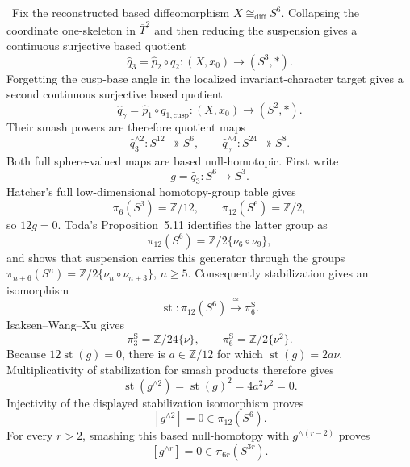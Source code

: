 \begin{auditrecord}
\Verified\ Fix the reconstructed based diffeomorphism
\(X\cong_{\mathrm{diff}}S^6\).  Collapsing the coordinate one-skeleton in
\(\overline T^2\) and then reducing the suspension gives a continuous
surjective based quotient
\[
 \widehat q_3=\widehat p_2\circ q_2:(X,x_0)\longrightarrow(S^3,*).
\]
Forgetting the cusp-base angle in the localized invariant-character target
gives a second continuous surjective based quotient
\[
 \widehat q_\gamma=\widehat p_1\circ q_{1,\mathrm{cusp}}:
 (X,x_0)\longrightarrow(S^2,*).
\]
Their smash powers are therefore quotient maps
\[
 \widehat q_3^{\wedge2}:S^{12}\twoheadrightarrow S^6,
 \qquad
 \widehat q_\gamma^{\wedge4}:S^{24}\twoheadrightarrow S^8.
\]
Both full sphere-valued maps are based null-homotopic.  First write
\[
 g=\widehat q_3:S^6\longrightarrow S^3.
\]
Hatcher's full low-dimensional homotopy-group table
\cite[p.~339]{Hatcher2002} gives
\[
 \pi_6(S^3)=\mathbb Z/12,
 \qquad
 \pi_{12}(S^6)=\mathbb Z/2,
\]
so \(12g=0\).  Toda's Proposition~5.11
\cite[Proposition~5.11]{Toda1962} identifies the latter group as
\[
 \pi_{12}(S^6)=\mathbb Z/2\{\nu_6\circ\nu_9\},
\]
and shows that suspension carries this generator through the groups
\(\pi_{n+6}(S^n)=\mathbb Z/2\{\nu_n\circ\nu_{n+3}\}\), \(n\geq5\).
Consequently stabilization gives an isomorphism
\[
 \operatorname{st}:\pi_{12}(S^6)\xrightarrow{\ \cong\ }\pi_6^{\mathrm S}.
\]
Isaksen--Wang--Xu
\cite[Table~1, p.~113]{IsaksenWangXu2023} gives
\[
 \pi_3^{\mathrm S}=\mathbb Z/24\{\nu\},
 \qquad
 \pi_6^{\mathrm S}=\mathbb Z/2\{\nu^2\}.
\]
Because \(12\operatorname{st}(g)=0\), there is
\(a\in\mathbb Z/12\) for which
\(\operatorname{st}(g)=2a\nu\).  Multiplicativity of stabilization for
smash products therefore gives
\[
 \operatorname{st}(g^{\wedge2})
 =\operatorname{st}(g)^2
 =4a^2\nu^2=0.
\]
Injectivity of the displayed stabilization isomorphism proves
\[
 [g^{\wedge2}]=0\in\pi_{12}(S^6).
\]
For every \(r>2\), smashing this based null-homotopy with
\(g^{\wedge(r-2)}\) proves
\[
 [g^{\wedge r}]=0\in\pi_{6r}(S^{3r}).
\]


\end{auditrecord}
